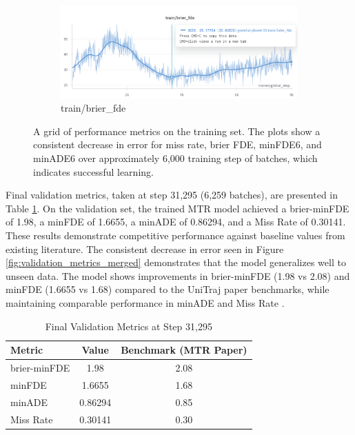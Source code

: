 \begin{figure}[htbp]
\begin{subfigure}[b]{0.48\textwidth}
        \centering
        \includegraphics[clip, width=\textwidth]{figures/train_brier_fde.png}
        \caption{train/brier\_fde}
    \end{subfigure}
    \caption{A grid of performance metrics on the training set. The plots show a consistent decrease in error for miss rate, brier FDE, minFDE6, and minADE6 over approximately 6,000 training step of batches, which indicates successful learning. }
    \label{fig:training_metrics_grid_merged}
\end{figure}

Final validation metrics, taken at step 31,295 (6,259 batches), are presented in Table \ref{tab:validation_results}.  On the validation set, the trained MTR model achieved a brier-minFDE of 1.98, a minFDE of 1.6655, a minADE of 0.86294, and a Miss Rate of 0.30141. These results demonstrate competitive performance against baseline values from existing literature. The consistent decrease in error seen in Figure \ref{fig:validation_metrics_merged} demonstrates that the model generalizes well to unseen data. The model shows improvements in brier-minFDE (1.98 vs 2.08) and minFDE (1.6655 vs 1.68) compared to the UniTraj paper benchmarks, while maintaining comparable performance in minADE and Miss Rate \cite{unitrajFeng2024}.

\begin{table}[htbp]
    \centering
    \caption{Final Validation Metrics at Step 31,295}
    \label{tab:validation_results}
    \begin{tabular}{@{}lcc@{}}
        \toprule
        \textbf{Metric} & \textbf{Value} & \textbf{Benchmark (MTR Paper)} \\
        \midrule
        brier-minFDE & 1.98  & 2.08  \\
        minFDE & 1.6655  & 1.68\\
        minADE & 0.86294  & 0.85 \\
        Miss Rate & 0.30141  & 0.30 \\
        \bottomrule
    \end{tabular}
\end{table}

